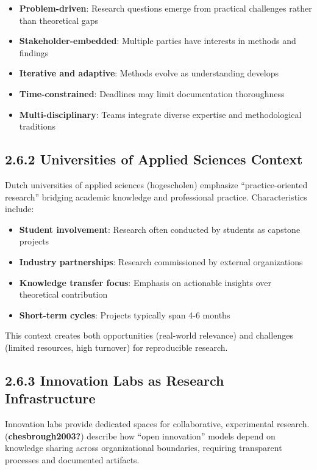 \documentclass[
  oneside,
  open=any]{scrbook}
\providecommand{\tightlist}{%
  \setlength{\itemsep}{0pt}\setlength{\parskip}{0pt}}\usepackage{longtable,booktabs,array}
\begin{document}
\begin{itemize}
\tightlist
\item
  \textbf{Problem-driven}: Research questions emerge from practical
  challenges rather than theoretical gaps
\item
  \textbf{Stakeholder-embedded}: Multiple parties have interests in
  methods and findings
\item
  \textbf{Iterative and adaptive}: Methods evolve as understanding
  develops
\item
  \textbf{Time-constrained}: Deadlines may limit documentation
  thoroughness
\item
  \textbf{Multi-disciplinary}: Teams integrate diverse expertise and
  methodological traditions
\end{itemize}

\subsection{2.6.2 Universities of Applied Sciences
Context}\label{universities-of-applied-sciences-context}

Dutch universities of applied sciences (hogescholen) emphasize
``practice-oriented research'' bridging academic knowledge and
professional practice. Characteristics include:

\begin{itemize}
\tightlist
\item
  \textbf{Student involvement}: Research often conducted by students as
  capstone projects
\item
  \textbf{Industry partnerships}: Research commissioned by external
  organizations
\item
  \textbf{Knowledge transfer focus}: Emphasis on actionable insights
  over theoretical contribution
\item
  \textbf{Short-term cycles}: Projects typically span 4-6 months
\end{itemize}

This context creates both opportunities (real-world relevance) and
challenges (limited resources, high turnover) for reproducible research.

\subsection{2.6.3 Innovation Labs as Research
Infrastructure}\label{innovation-labs-as-research-infrastructure}

Innovation labs provide dedicated spaces for collaborative, experimental
research. (\textbf{chesbrough2003?}) describe how ``open innovation''
models depend on knowledge sharing across organizational boundaries,
requiring transparent processes and documented artifacts.
\end{document}
